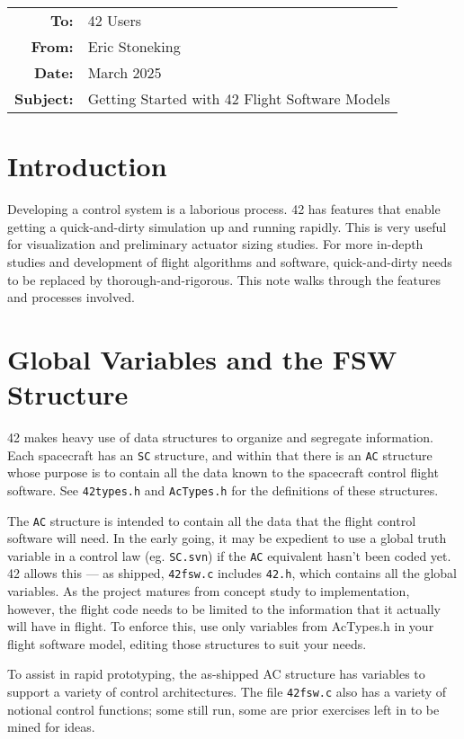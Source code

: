 \documentclass[12pt]{article}
\begin{document}
\begin{tabular}{@{} rl @{}}
    {\bf To:} & 42 Users\\ 
    {\bf From:} & Eric Stoneking \\ 
    {\bf Date:} & March 2025 \\ 
    {\bf Subject:} & Getting Started with 42 Flight Software Models\\ 
\hline
\end{tabular}
  
  
\section{Introduction}

Developing a control system is a laborious process.  42 has features that enable getting a quick-and-dirty simulation up and running rapidly.  This is very useful for visualization and preliminary actuator sizing studies.  For more in-depth studies and development of flight algorithms and software, quick-and-dirty needs to be replaced by thorough-and-rigorous.  This note walks through the features and processes involved.

\section{Global Variables and the FSW Structure}

42 makes heavy use of data structures to organize and segregate information.  Each spacecraft has an {\tt SC} structure, and within that there is an {\tt AC} structure whose purpose is to contain all the data known to the spacecraft control flight software.  See {\tt 42types.h} and {\tt AcTypes.h} for the definitions of these structures.  

The {\tt AC} structure is intended to contain all the data that the flight control software will need.  In the early going, it may be expedient to use a global truth variable in a control law (eg. {\tt SC.svn}) if the {\tt AC} equivalent hasn't been coded yet.  42 allows this --- as shipped, {\tt 42fsw.c} includes {\tt 42.h}, which contains all the global variables.  As the project matures from concept study to implementation, however, the flight code needs to be limited to the information that it actually will have in flight.  To enforce this, use only variables from AcTypes.h in your flight software model, editing those structures to suit your needs.  

To assist in rapid prototyping, the as-shipped AC structure has variables to support a variety of control architectures.  The file {\tt 42fsw.c} also has a variety of notional control functions; some still run, some are prior exercises left in to be mined for ideas.
\end{document}
